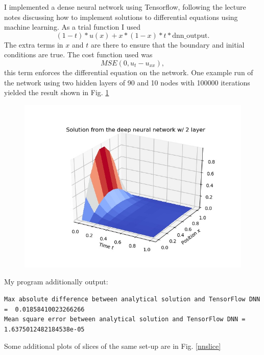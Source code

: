 \documentclass[10pt,a4paper]{article}
\begin{document}
I implemented a dense neural network using Tensorflow, following the lecture notes discussing how to implement solutions to differential equations using machine learning. As a trial function I used
\[(1-t)*u(x) + x*(1-x)*t*\text{dnn\_output}.\]
The extra terms in $x$ and $t$ are there to ensure that the boundary and initial conditions are true. 
The cost function used was 
\[MSE(0, u_t - u_{xx}),\]
this term enforces the differential equation on the network. One example run of the network using two hidden layers of 90 and 10 nodes with 100000 iterations yielded the result shown in Fig. \ref{nnplot}
\begin{figure}[!ht]
	
	\begin{center}
		\includegraphics[width=\textwidth]{nn_plot.jpg}
	\end{center}
	\label{nnplot}
	
\end{figure}

My program additionally output:
\begin{verbatim}
Max absolute difference between analytical solution and TensorFlow DNN =  0.01858410023266266
Mean square error between analytical solution and TensorFlow DNN =  1.6375012482184538e-05
\end{verbatim}

Some additional plots of slices of the same set-up are in Fig. \ref{nnslice}
\end{document}
